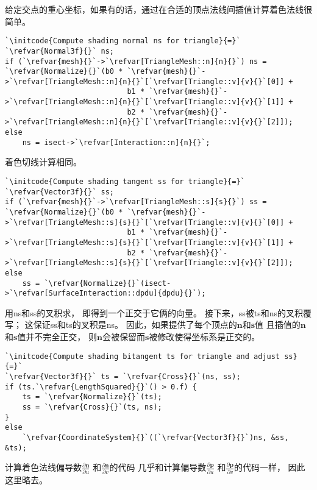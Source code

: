 给定交点的重心坐标，如果有的话，通过在合适的顶点法线间插值计算着色法线很简单。
\begin{lstlisting}
`\initcode{Compute shading normal ns for triangle}{=}`
`\refvar{Normal3f}{}` ns;
if (`\refvar{mesh}{}`->`\refvar[TriangleMesh::n]{n}{}`) ns = `\refvar{Normalize}{}`(b0 * `\refvar{mesh}{}`->`\refvar[TriangleMesh::n]{n}{}`[`\refvar[Triangle::v]{v}{}`[0]] +
                            b1 * `\refvar{mesh}{}`->`\refvar[TriangleMesh::n]{n}{}`[`\refvar[Triangle::v]{v}{}`[1]] + 
                            b2 * `\refvar{mesh}{}`->`\refvar[TriangleMesh::n]{n}{}`[`\refvar[Triangle::v]{v}{}`[2]]);
else
    ns = isect->`\refvar[Interaction::n]{n}{}`;
\end{lstlisting}

着色切线计算相同。
\begin{lstlisting}
`\initcode{Compute shading tangent ss for triangle}{=}`
`\refvar{Vector3f}{}` ss;
if (`\refvar{mesh}{}`->`\refvar[TriangleMesh::s]{s}{}`) ss = `\refvar{Normalize}{}`(b0 * `\refvar{mesh}{}`->`\refvar[TriangleMesh::s]{s}{}`[`\refvar[Triangle::v]{v}{}`[0]] +
                            b1 * `\refvar{mesh}{}`->`\refvar[TriangleMesh::s]{s}{}`[`\refvar[Triangle::v]{v}{}`[1]] + 
                            b2 * `\refvar{mesh}{}`->`\refvar[TriangleMesh::s]{s}{}`[`\refvar[Triangle::v]{v}{}`[2]]);
else
    ss = `\refvar{Normalize}{}`(isect->`\refvar[SurfaceInteraction::dpdu]{dpdu}{}`);
\end{lstlisting}

用{\ttfamily ns}和{\ttfamily ss}的叉积求，
即得到一个正交于它俩的向量。
接下来，{\ttfamily ss}被{\ttfamily ts}和{\ttfamily ns}的叉积覆写；
这保证{\ttfamily ss}和{\ttfamily ts}的叉积是{\ttfamily ns}。
因此，如果提供了每个顶点的$\bm n$和$\bm s$值
且插值的$\bm n$和$\bm s$值并不完全正交，
则$\bm n$会被保留而$\bm s$被修改使得坐标系是正交的。
\begin{lstlisting}
`\initcode{Compute shading bitangent ts for triangle and adjust ss}{=}`
`\refvar{Vector3f}{}` ts = `\refvar{Cross}{}`(ns, ss);
if (ts.`\refvar{LengthSquared}{}`() > 0.f) {
    ts = `\refvar{Normalize}{}`(ts);
    ss = `\refvar{Cross}{}`(ts, ns);
}
else
    `\refvar{CoordinateSystem}{}`((`\refvar{Vector3f}{}`)ns, &ss, &ts);
\end{lstlisting}

计算着色法线偏导数$\displaystyle\frac{\partial\bm n}{\partial u}$
和$\displaystyle\frac{\partial\bm n}{\partial v}$的代码
几乎和计算偏导数$\displaystyle\frac{\partial\bm p}{\partial u}$
和$\displaystyle\frac{\partial\bm p}{\partial v}$的代码一样，
因此这里略去。


